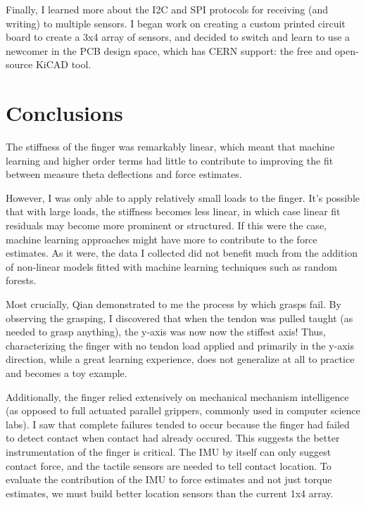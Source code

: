 \documentclass[12pt]{article}
\begin{document}
Finally, I learned more about the I2C and SPI protocols for receiving (and writing) to multiple
sensors. I began work on creating a custom printed circuit board to create a 3x4 array of sensors,
and decided to switch and learn to use a newcomer in the PCB design space, which has CERN support: the free and open-source
KiCAD tool.

\section{Conclusions}

The stiffness of the finger was remarkably linear, which meant that machine learning and higher
order terms had little to contribute to improving the fit between measure theta deflections and
force estimates.

However, I was only able to apply relatively small loads to the finger. It's possible that with
large loads, the stiffness becomes less linear, in which case linear fit residuals may become more
prominent or structured. If this were the case, machine learning approaches might have more to
contribute to the force estimates. As it were, the data I collected did not benefit much from the
addition of non-linear models fitted with machine learning techniques such as random forests.

Most crucially, Qian demonstrated to me the process by which grasps fail. By observing the grasping,
I discovered that when the tendon was pulled taught (as needed to grasp anything), the y-axis was now
now the stiffest axis! Thus, characterizing the finger with no tendon load applied and primarily in
the y-axis direction, while a great learning experience, does not generalize at all to practice and becomes a
toy example.

Additionally, the finger relied extensively on mechanical mechanism intelligence (as opposed to full
actuated parallel grippers, commonly used in computer science labs).  I saw that complete failures
tended to occur because the finger had failed to detect contact when contact had already occured.
This suggests the better instrumentation of the finger is critical. The IMU by itself can only
suggest contact force, and the tactile sensors are needed to tell contact location. To evaluate the
contribution of the IMU to force estimates and not just torque estimates, we must build better
location sensors than the current 1x4 array.

\end{document}
